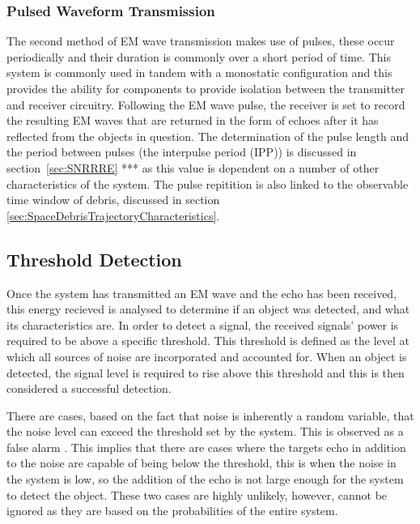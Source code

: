 \documentclass[11pt]{witseiepaper}
\begin{document}
\subsubsection{Pulsed Waveform Transmission} \label{sec:PulsedWaveformTransmission}

The second method of EM wave transmission makes use of pulses, these occur periodically and their duration is commonly over a short period of time. This system is commonly used in tandem with a monostatic configuration and this provides the ability for components to provide isolation between the transmitter and receiver circuitry.
Following the EM wave pulse, the receiver is set to record the resulting EM waves that are returned in the form of echoes after it has reflected from the objects in question. The determination of the pulse length and the period between pulses (the interpulse period (IPP)) is discussed in section~\ref{sec:SNRRRE} *** as this value is dependent on a number of other characteristics of the system. The pulse repitition is also linked to the observable time window of debris, discussed in section \ref{sec:SpaceDebrisTrajectoryCharacteristics}.


\subsection{Threshold Detection} \label{sec:ThresholdDetection}
Once the system has transmitted an EM wave and the echo has been received, this energy recieved is analysed to determine if an object was detected, and what its characteristics are.
In order to detect a signal, the received signals' power is required to be above a specific threshold. This threshold is defined as the level at which all sources of noise are incorporated and accounted for. When an object is detected, the signal level is required to rise above this threshold and this is then considered a successful detection.

There are cases, based on the fact that noise is inherently a random variable, that the noise level can exceed the threshold set by the system. This is observed as a false alarm \cite[Ch~.3]{radarHandbook}.
This implies that there are cases where the targets echo in addition to the noise are capable of being below the threshold, this is when the noise in the system is low, so the addition of the echo is not large enough for the system to detect the object.
These two cases are highly unlikely, however, cannot be ignored as they are based on the probabilities of the entire system.
\end{document}
